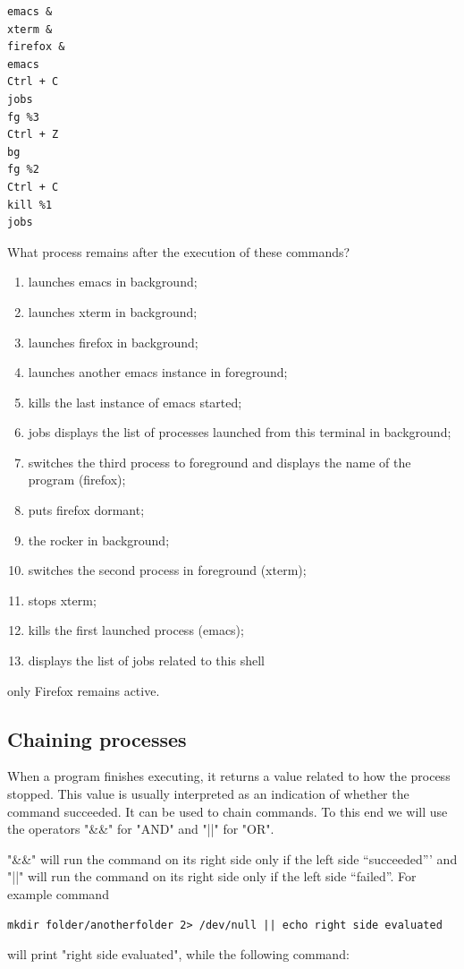 \documentclass[11pt]{article}
\begin{document}
\begin{lstlisting}
emacs &
xterm &
firefox &
emacs
Ctrl + C
jobs
fg %3
Ctrl + Z
bg
fg %2
Ctrl + C
kill %1
jobs
\end{lstlisting}

What process remains after the execution of these commands?

\begin{solution}
	\begin{enumerate}
		\item launches emacs in background;
		\item launches xterm in background;
		\item launches firefox in background;
		\item launches another emacs instance in foreground;
		\item kills the last instance of emacs started;
		\item jobs displays the list of processes launched from this terminal in background;
		\item switches the third process to foreground and displays the name of the program (firefox);
		\item puts firefox dormant;
		\item the rocker in background;
		\item switches the second process in foreground (xterm);
		\item stops xterm;
		\item kills the first launched process (emacs);
		\item displays the list of jobs related to this shell
	\end{enumerate}
	
	only Firefox remains active.
	
\end{solution}

\subsection{Chaining processes}

When a program finishes executing, it returns a value related to how the process stopped. This value is usually interpreted as an indication of whether the command succeeded. It can be used to chain commands. To this end we will use the operators "\&\&" for "AND" and "||" for "OR".
\smallskip

\noindent "\&\&" will run the command on its right side only if the left side ``succeeded''' and "||" will run the command on its right side only if the left side ``failed''.  For example command \\
\begin{lstlisting}
mkdir folder/anotherfolder 2> /dev/null || echo right side evaluated
\end{lstlisting}
will print "right side evaluated", while the following command:\\
\end{document}
